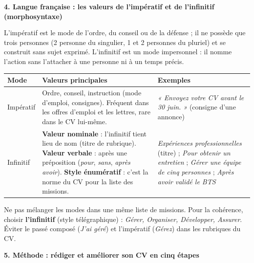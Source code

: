 \documentclass[11pt]{article}
\newcommand{\cle}[1]{{\popxbold\color{popdark}#1}}
\begin{document}
\textbf{4. Langue française : les valeurs de l'impératif et de l'infinitif (morphosyntaxe)}\par

\begin{definition}
L'\cle{impératif} est le mode de l'ordre, du conseil ou de la défense ; il ne possède que trois personnes (2 personne du singulier, 1 et 2 personnes du pluriel) et se construit sans sujet exprimé. L'\cle{infinitif} est un mode impersonnel : il nomme l'action sans l'attacher à une personne ni à un temps précis.
\end{definition}

\begin{center}
\begin{tabularx}{\linewidth}{|l|X|X|}\hline
\rowcolor{popgreenL}
\textbf{Mode} & \textbf{Valeurs principales} & \textbf{Exemples} \\\hline
\cle{Impératif} & Ordre, conseil, instruction (mode d'emploi, consignes). Fréquent dans les offres d'emploi et les lettres, rare dans le CV lui-même. & \emph{« Envoyez votre CV avant le 30 juin. »} (consigne d'une annonce) \\\hline
\cle{Infinitif} & \textbf{Valeur nominale} : l'infinitif tient lieu de nom (titre de rubrique). \textbf{Valeur verbale} : après une préposition (\emph{pour}, \emph{sans}, \emph{après avoir}). \textbf{Style énumératif} : c'est la norme du CV pour la liste des missions. & \emph{Expériences professionnelles} (titre) ; \emph{Pour obtenir un entretien} ; \emph{Gérer une équipe de cinq personnes} ; \emph{Après avoir validé le BTS} \\\hline
\end{tabularx}
\end{center}

\begin{attention}
Ne pas mélanger les modes dans une même liste de missions. Pour la cohérence, choisir \textbf{l'infinitif} (style télégraphique) : \emph{Gérer, Organiser, Développer, Assurer}. Éviter le passé composé (\emph{J'ai géré}) et l'impératif (\emph{Gérez}) dans les rubriques du CV.
\end{attention}

\textbf{5. Méthode : rédiger et améliorer son CV en cinq étapes}\par
\end{document}
